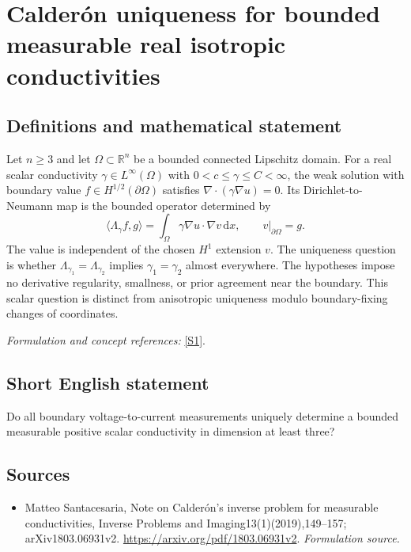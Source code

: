 \documentclass[11pt]{article}
\begin{document}
\section*{\texorpdfstring{Calderón uniqueness for bounded measurable real isotropic conductivities}{Calderón uniqueness for bounded measurable real isotropic conductivities}}\label{314}
\subsection{Definitions and mathematical statement}
Let $n\ge3$ and let $\Omega\subset{\mathbb{R}}^n$ be a bounded connected Lipschitz domain. For a real scalar conductivity $\gamma\in L^\infty(\Omega)$ with $0<c\le\gamma\le C<\infty$, the weak solution with boundary value $f\in H^{1/2}(\partial\Omega)$ satisfies $\nabla\cdot(\gamma\nabla u)=0$. Its Dirichlet-to-Neumann map is the bounded operator determined by
\[
 \langle\Lambda_\gamma f,g\rangle
 =\int_\Omega\gamma\nabla u\cdot\nabla v{\,\mathrm{d}} x,
 \qquad v|_{\partial\Omega}=g.
\]
The value is independent of the chosen $H^1$ extension $v$. The uniqueness question is whether $\Lambda_{\gamma_1}=\Lambda_{\gamma_2}$ implies $\gamma_1=\gamma_2$ almost everywhere. The hypotheses impose no derivative regularity, smallness, or prior agreement near the boundary. This scalar question is distinct from anisotropic uniqueness modulo boundary-fixing changes of coordinates.
\par\smallskip\textit{Formulation and concept references:} \href{https://arxiv.org/pdf/1803.06931v2}{[S1]}.

\subsection{Short English statement}
Do all boundary voltage-to-current measurements uniquely determine a bounded measurable positive scalar conductivity in dimension at least three?
\subsection{Sources}
\begin{itemize}
\item[S1]Matteo Santacesaria, Note on Calderón's inverse problem for measurable conductivities, Inverse Problems and Imaging13(1)(2019),149–157; arXiv1803.06931v2.
\url{https://arxiv.org/pdf/1803.06931v2}.
\textit{Formulation source.}
\end{itemize}
\end{document}
